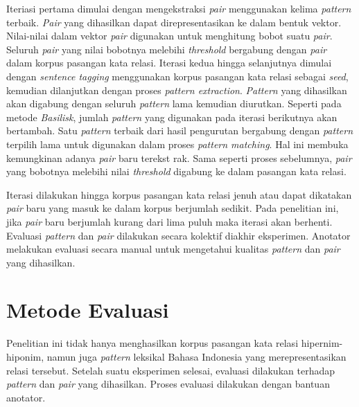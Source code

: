Iteriasi pertama dimulai dengan mengekstraksi \textit{pair} menggunakan kelima \textit{pattern} terbaik. \textit{Pair} yang dihasilkan dapat direpresentasikan ke dalam bentuk vektor. Nilai-nilai dalam vektor \textit{pair} digunakan untuk menghitung bobot suatu \textit{pair}. Seluruh \textit{pair} yang nilai bobotnya melebihi \textit{threshold} bergabung dengan \textit{pair} dalam korpus pasangan kata relasi. Iterasi kedua hingga selanjutnya dimulai dengan \textit{sentence tagging} menggunakan korpus pasangan kata relasi sebagai \textit{seed}, kemudian dilanjutkan dengan proses \textit{pattern extraction}. \textit{Pattern} yang dihasilkan akan digabung dengan seluruh \textit{pattern} lama kemudian diurutkan. Seperti pada metode \textit{Basilisk}, jumlah \textit{pattern} yang digunakan pada iterasi berikutnya akan bertambah. Satu \textit{pattern} terbaik dari hasil pengurutan bergabung dengan \textit{pattern} terpilih lama untuk digunakan dalam proses \textit{pattern matching}. Hal ini membuka kemungkinan adanya \textit{pair} baru terekst
rak. Sama seperti proses sebelumnya, \textit{pair} yang bobotnya melebihi nilai \textit{threshold} digabung ke dalam \noindent pasangan kata relasi.

Iterasi dilakukan hingga korpus pasangan kata relasi jenuh atau dapat dikatakan \textit{pair} baru yang masuk ke dalam korpus berjumlah sedikit. Pada penelitian ini, jika \textit{pair} baru berjumlah kurang dari lima puluh maka iterasi akan berhenti. Evaluasi \textit{pattern} dan \textit{pair} dilakukan secara kolektif diakhir eksperimen. Anotator melakukan evaluasi secara manual untuk mengetahui kualitas \textit{pattern} dan \textit{pair} yang dihasilkan.


\section{Metode Evaluasi}
Penelitian ini tidak hanya menghasilkan korpus pasangan kata relasi hipernim-hiponim, namun juga \textit{pattern} leksikal Bahasa Indonesia yang merepresentasikan relasi tersebut. Setelah suatu eksperimen selesai, evaluasi dilakukan terhadap \textit{pattern} dan \textit{pair} yang dihasilkan. Proses evaluasi dilakukan dengan bantuan anotator.

